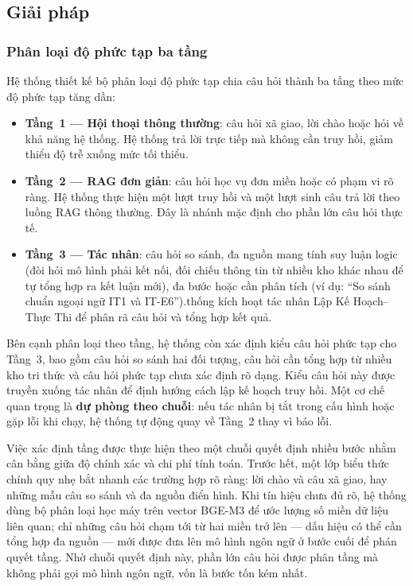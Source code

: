 \documentclass[../DoAn.tex]{subfiles}
\begin{document}
\subsection{Giải pháp}

\subsubsection{Phân loại độ phức tạp ba tầng}

Hệ thống thiết kế bộ phân loại độ phức tạp chia câu hỏi thành ba tầng theo mức
độ phức tạp tăng dần:

\begin{itemize}
    \item \textbf{Tầng~1 --- Hội thoại thông thường}: câu hỏi xã giao, lời chào
    hoặc hỏi về khả năng hệ thống. Hệ thống trả lời trực tiếp mà không cần truy
    hồi, giảm thiểu độ trễ xuống mức tối thiểu.
    \item \textbf{Tầng~2 --- RAG đơn giản}: câu hỏi học vụ đơn miền hoặc có
    phạm vi rõ ràng. Hệ thống thực hiện một lượt truy hồi và một lượt sinh câu
    trả lời theo luồng RAG thông thường. Đây là nhánh mặc định cho phần lớn câu
    hỏi thực tế.
    \item \textbf{Tầng~3 --- Tác nhân}: câu hỏi so sánh, đa nguồn mang tính suy luận logic (đòi hỏi mô hình phải kết nối, đối chiếu thông tin từ nhiều kho khác nhau để tự tổng hợp ra kết luận mới), đa bước hoặc
    cần phân tích (ví dụ: ``So sánh chuẩn ngoại ngữ IT1 và IT-E6'').thống kích hoạt tác nhân Lập Kế
    Hoạch--Thực Thi để phân rã câu hỏi và tổng hợp kết quả.
\end{itemize}

Bên cạnh phân loại theo tầng, hệ thống còn xác định kiểu câu hỏi phức tạp cho
Tầng~3, bao gồm câu hỏi so sánh hai đối tượng, câu hỏi cần tổng hợp từ nhiều
kho tri thức và câu hỏi phức tạp chưa xác định rõ dạng. Kiểu câu hỏi này được
truyền xuống tác nhân để định hướng cách lập kế hoạch truy hồi. Một cơ chế
quan trọng là \textbf{dự phòng theo chuỗi}: nếu tác nhân bị tắt trong cấu hình
hoặc gặp lỗi khi chạy, hệ thống tự động quay về Tầng~2 thay vì báo lỗi.

Việc xác định tầng được thực hiện theo một chuỗi quyết định nhiều bước nhằm cân
bằng giữa độ chính xác và chi phí tính toán. Trước hết, một lớp biểu thức chính
quy nhẹ bắt nhanh các trường hợp rõ ràng: lời chào và câu xã giao, hay những
mẫu câu so sánh và đa nguồn điển hình. Khi tín hiệu chưa đủ rõ, hệ thống dùng
bộ phân loại học máy trên vector BGE-M3 để ước lượng số miền dữ liệu liên quan;
chỉ những câu hỏi chạm tới từ hai miền trở lên --- dấu hiệu có thể cần tổng hợp
đa nguồn --- mới được đưa lên mô hình ngôn ngữ ở bước cuối để phán quyết tầng.
Nhờ chuỗi quyết định này, phần lớn câu hỏi được phân tầng mà không phải gọi mô
hình ngôn ngữ, vốn là bước tốn kém nhất.
\end{document}
